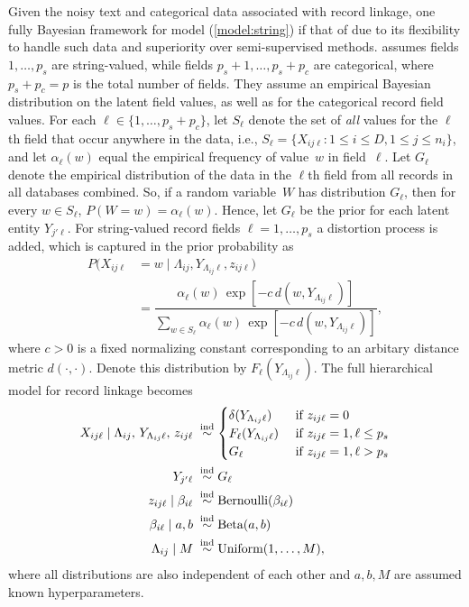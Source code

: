 \documentclass[11pt]{article}\usepackage[]{graphicx}\usepackage[]{color}
\begin{document}
Given the noisy text and categorical data associated with record linkage, one fully Bayesian framework for model (\ref{model:string}) if that of \cite{steorts15entity} due to its flexibility to handle such data and superiority over semi-supervised methods. 
\cite{steorts15entity} assumes fields $1,\ldots,p_s$ are string-valued, while fields $p_s+1,\ldots,p_s+p_c$ are categorical, where $p_s+p_c=p$ is the total number of fields. They assume an empirical Bayesian distribution on the latent field values, as well as for the categorical record field values. For each $\ell\in\{1,\ldots,p_s+p_c\}$, let $S_\ell$ denote the set of \emph{all} values for the $\ell$th field that occur anywhere in the data, i.e., $S_\ell=\{X_{ij\ell}:1\le i\le D, 1\le j\le n_i\}$, and let $\alpha_\ell(w)$ equal the empirical frequency of value~$w$ in field~$\ell.$ Let $G_\ell$ denote the empirical distribution of the data in the $\ell$th field from all records in all databases combined.  So, if a random variable~$W$ has distribution $G_\ell$, then for every $w\in S_\ell$, $P(W=w)=\alpha_\ell(w)$. Hence, let $G_\ell$  be the prior for each latent entity $Y_{j'\ell}$.
%
For string-valued record fields $\ell = 1, \dots, p_s$ a distortion process is added, which is captured in the prior probability as
\begin{align*}
P(X_{ij\ell}&=w\mid\Lambda_{ij},Y_{\Lambda_{ij}\ell},z_{ij\ell}) \\
&=\dfrac{\alpha_\ell(w)\,\exp[-c\,d(w,Y_{\Lambda_{ij}\ell})]}{\sum_{w\in S_\ell}\alpha_\ell(w)\,\exp[-c\,d(w,Y_{\Lambda_{ij}\ell})]},
\end{align*}
where $c > 0$ is a fixed normalizing constant corresponding to an arbitary distance metric $d(\cdot,\cdot)$.  Denote this distribution by $F_\ell(Y_{\Lambda_{ij}\ell})$. The full hierarchical model for record linkage becomes
\begin{align}
X_{ij\ell}\mid \Lambda_{ij},\,Y_{\Lambda_{ij}\ell},\,z_{ij\ell}\;&\stackrel{\text{ind}}{\sim}\begin{cases}\delta(Y_{\Lambda_{ij}\ell})&\text{ if }z_{ij\ell}=0\\F_\ell(Y_{\Lambda_{ij}\ell})&\text{ if }z_{ij\ell}=1, \ell\le p_s\\G_\ell&\text{ if }z_{ij\ell}=1, \ell>p_s\end{cases} \notag \\
Y_{j'\ell}\;&\stackrel{\text{ind}}{\sim}G_\ell \notag \\
z_{ij\ell}\mid\beta_{i\ell}\;&\stackrel{\text{ind}}{\sim}\text{Bernoulli}(\beta_{i\ell}) \notag\\
\beta_{i\ell} \mid a,b \;&\stackrel{\text{ind}}{\sim}\text{Beta}(a,b) \notag \\
\Lambda_{ij} \mid M\;&\stackrel{\text{ind}}{\sim}\text{Uniform}\left(1,\ldots, M\right),
\label{model:string_spec}
\end{align}
where all distributions are also independent of each other and $a,b, M$ are assumed known hyperparameters. %
\end{document}
